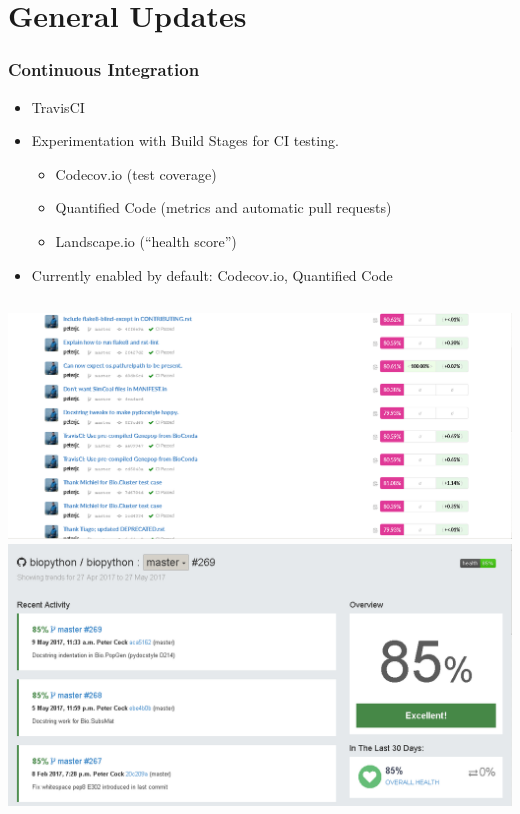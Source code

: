 \documentclass[trans]{beamer}
\begin{document}
\section{General Updates}
\frame
{
  \frametitle{Continuous Integration}

  \begin{itemize}
  \item TravisCI
  \item Experimentation with Build Stages for CI testing.
  \begin{itemize}
  \item Codecov.io (test coverage)
  \item Quantified Code (metrics and automatic pull requests)
  \item Landscape.io (``health score'')
  \end{itemize}
  \item Currently enabled by default: Codecov.io, Quantified Code
  \end{itemize}

  \begin{columns}
  \includegraphics[width=1\textwidth]{figures/bp-codecov.png}
  \includegraphics[width=1\textwidth]{figures/bp-landscape.png}
  \end{columns}
}
\end{document}
